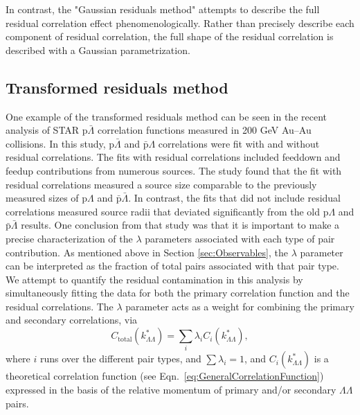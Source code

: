 In contrast, the "Gaussian residuals method" attempts to describe the full residual correlation effect phenomenologically.  
Rather than precisely describe each component of residual correlation, the full shape of the residual correlation is described with a Gaussian parametrization.  


\subsection{Transformed residuals method}
\label{sec:TransformedResiduals}


One example of the transformed residuals method can be seen in the recent analysis \cite{Kisiel:2014mma} of STAR p$\bar{\Lambda}$ correlation functions measured in 200 GeV Au--Au collisions.  
In this study, p$\bar{\Lambda}$ and $\bar{\mathrm{p}}\Lambda$ correlations were fit with and without residual correlations.  
The fits with residual correlations included feeddown and feedup contributions from numerous sources.  
The study found that the fit with residual correlations measured a source size comparable to the previously measured sizes of p$\Lambda$ and $\bar{\mathrm{p}}\bar{\Lambda}$.  
In contrast, the fits that did not include residual correlations measured source radii that deviated significantly from the old p$\Lambda$ and $\bar{\mathrm{p}}\bar{\Lambda}$ results.  
One conclusion from that study was that it is important to make a precise characterization of the $\lambda$ parameters associated with each type of pair contribution.  
As mentioned above in Section \ref{sec:Observables}, the $\lambda$ parameter can be interpreted as the fraction of total pairs associated with that pair type.  
We attempt to quantify the residual contamination in this analysis by simultaneously fitting the data for both the primary correlation function and the residual correlations.  
The $\lambda$ parameter acts as a weight for combining the primary and secondary correlations, via
\begin{equation}
\label{eq:GeneralizedLambda}
C_{\mathrm{total}}(k^*_{\Lambda\Lambda})= \sum_{i} \lambda_{i} C_{i}(k^*_{\Lambda\Lambda}),
\end{equation}
where $i$ runs over the different pair types, and $\sum \lambda_{i} = 1$, and $C_{i}(k^*_{\Lambda\Lambda})$ is a theoretical correlation function (see Eqn.\ \ref{eq:GeneralCorrelationFunction}) expressed in the basis of the relative momentum of primary and/or secondary $\Lambda\Lambda$ pairs.


